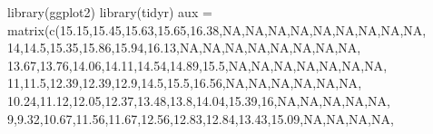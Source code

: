 \documentclass[
]{book}
\newenvironment{Shaded}{\begin{snugshade}}{\end{snugshade}}
\newcommand{\ConstantTok}[1]{\textcolor[rgb]{0.00,0.00,0.00}{#1}}
\newcommand{\DecValTok}[1]{\textcolor[rgb]{0.00,0.00,0.81}{#1}}
\newcommand{\FloatTok}[1]{\textcolor[rgb]{0.00,0.00,0.81}{#1}}
\newcommand{\FunctionTok}[1]{\textcolor[rgb]{0.00,0.00,0.00}{#1}}
\newcommand{\NormalTok}[1]{#1}
\newcommand{\OtherTok}[1]{\textcolor[rgb]{0.56,0.35,0.01}{#1}}
\begin{document}
\begin{Shaded}
\begin{Highlighting}[]
\FunctionTok{library}\NormalTok{(ggplot2)}
\FunctionTok{library}\NormalTok{(tidyr)}
\NormalTok{aux }\OtherTok{=} \FunctionTok{matrix}\NormalTok{(}\FunctionTok{c}\NormalTok{(}\FloatTok{15.15}\NormalTok{,}\FloatTok{15.45}\NormalTok{,}\FloatTok{15.63}\NormalTok{,}\FloatTok{15.65}\NormalTok{,}\FloatTok{16.38}\NormalTok{,}\ConstantTok{NA}\NormalTok{,}\ConstantTok{NA}\NormalTok{,}\ConstantTok{NA}\NormalTok{,}\ConstantTok{NA}\NormalTok{,}\ConstantTok{NA}\NormalTok{,}\ConstantTok{NA}\NormalTok{,}\ConstantTok{NA}\NormalTok{,}\ConstantTok{NA}\NormalTok{,}\ConstantTok{NA}\NormalTok{,}
               \DecValTok{14}\NormalTok{,}\FloatTok{14.5}\NormalTok{,}\FloatTok{15.35}\NormalTok{,}\FloatTok{15.86}\NormalTok{,}\FloatTok{15.94}\NormalTok{,}\FloatTok{16.13}\NormalTok{,}\ConstantTok{NA}\NormalTok{,}\ConstantTok{NA}\NormalTok{,}\ConstantTok{NA}\NormalTok{,}\ConstantTok{NA}\NormalTok{,}\ConstantTok{NA}\NormalTok{,}\ConstantTok{NA}\NormalTok{,}\ConstantTok{NA}\NormalTok{,}\ConstantTok{NA}\NormalTok{,}
               \FloatTok{13.67}\NormalTok{,}\FloatTok{13.76}\NormalTok{,}\FloatTok{14.06}\NormalTok{,}\FloatTok{14.11}\NormalTok{,}\FloatTok{14.54}\NormalTok{,}\FloatTok{14.89}\NormalTok{,}\FloatTok{15.5}\NormalTok{,}\ConstantTok{NA}\NormalTok{,}\ConstantTok{NA}\NormalTok{,}\ConstantTok{NA}\NormalTok{,}\ConstantTok{NA}\NormalTok{,}\ConstantTok{NA}\NormalTok{,}\ConstantTok{NA}\NormalTok{,}\ConstantTok{NA}\NormalTok{,}
               \DecValTok{11}\NormalTok{,}\FloatTok{11.5}\NormalTok{,}\FloatTok{12.39}\NormalTok{,}\FloatTok{12.39}\NormalTok{,}\FloatTok{12.9}\NormalTok{,}\FloatTok{14.5}\NormalTok{,}\FloatTok{15.5}\NormalTok{,}\FloatTok{16.56}\NormalTok{,}\ConstantTok{NA}\NormalTok{,}\ConstantTok{NA}\NormalTok{,}\ConstantTok{NA}\NormalTok{,}\ConstantTok{NA}\NormalTok{,}\ConstantTok{NA}\NormalTok{,}\ConstantTok{NA}\NormalTok{,}
               \FloatTok{10.24}\NormalTok{,}\FloatTok{11.12}\NormalTok{,}\FloatTok{12.05}\NormalTok{,}\FloatTok{12.37}\NormalTok{,}\FloatTok{13.48}\NormalTok{,}\FloatTok{13.8}\NormalTok{,}\FloatTok{14.04}\NormalTok{,}\FloatTok{15.39}\NormalTok{,}\DecValTok{16}\NormalTok{,}\ConstantTok{NA}\NormalTok{,}\ConstantTok{NA}\NormalTok{,}\ConstantTok{NA}\NormalTok{,}\ConstantTok{NA}\NormalTok{,}\ConstantTok{NA}\NormalTok{,}
               \DecValTok{9}\NormalTok{,}\FloatTok{9.32}\NormalTok{,}\FloatTok{10.67}\NormalTok{,}\FloatTok{11.56}\NormalTok{,}\FloatTok{11.67}\NormalTok{,}\FloatTok{12.56}\NormalTok{,}\FloatTok{12.83}\NormalTok{,}\FloatTok{12.84}\NormalTok{,}\FloatTok{13.43}\NormalTok{,}\FloatTok{15.09}\NormalTok{,}\ConstantTok{NA}\NormalTok{,}\ConstantTok{NA}\NormalTok{,}\ConstantTok{NA}\NormalTok{,}\ConstantTok{NA}\NormalTok{,}

\end{Highlighting}
\end{Shaded}
\end{document}
